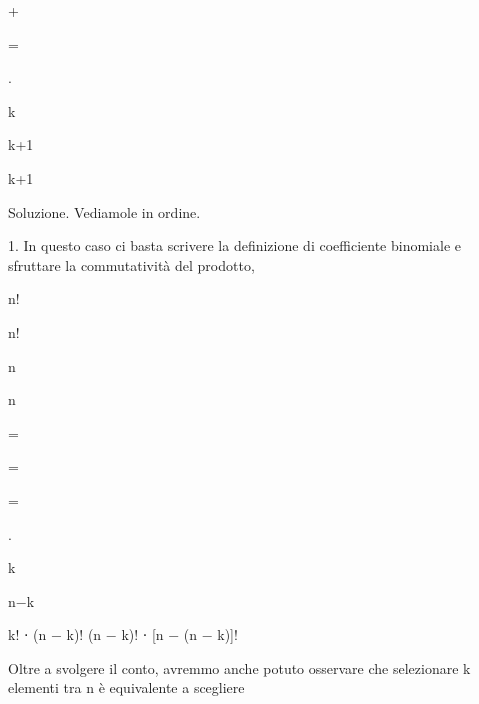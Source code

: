 \documentclass[a4paper,portrait,12pt]{article}
\begin{document}
+


=


.


\begin{flushleft}
k
\end{flushleft}


\begin{flushleft}
k+1
\end{flushleft}


\begin{flushleft}
k+1
\end{flushleft}





\begin{flushleft}
Soluzione. Vediamole in ordine.
\end{flushleft}


\begin{flushleft}
1. In questo caso ci basta scrivere la definizione di coefficiente binomiale e sfruttare la commutativit\`{a} del prodotto,
\end{flushleft}


\begin{flushleft}
n!
\end{flushleft}


\begin{flushleft}
n!
\end{flushleft}


\begin{flushleft}
n
\end{flushleft}


\begin{flushleft}
n
\end{flushleft}


=


=


=


.


\begin{flushleft}
k
\end{flushleft}


\begin{flushleft}
n$-$k
\end{flushleft}


\begin{flushleft}
k! ⋅ (n $-$ k)! (n $-$ k)! ⋅ [n $-$ (n $-$ k)]!
\end{flushleft}


\begin{flushleft}
Oltre a svolgere il conto, avremmo anche potuto osservare che selezionare k elementi tra n \`{e} equivalente a scegliere
\end{flushleft}
\end{document}
